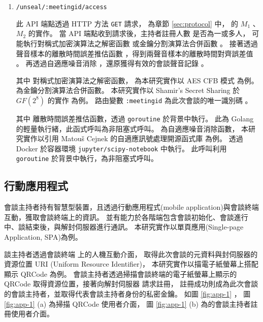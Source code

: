\begin{enumerate}
    \item \texttt{/unseal/:meetingid/access}

        此 API 端點透過 HTTP 方法 \texttt{GET} 請求，
    為章節 \ref{sec:protocol} 中，
     的 $M_{1}$ 、 $M_{2}$ 的實作。
    當 API 端點收到請求後，主持者註冊人數 \DEFowreg 是否為一或多人，
    可能執行對稱式加密演算法之解密函數 \DEFfuncDecEK{} 或金鑰分割演算法合併函數 \DEFfuncSSC{}。
    接著透過聲音樣本的離散時間誤差推估函數 \DEFfuncEstm{}，得到兩聲音樣本的離散時間對齊誤差值 \DEFshift。
    再透過自適應噪音消除 \DEFfuncAnc{}，還原獲得有效的會談聲音記錄 \DEFrecREV。

        其中 \DEFfuncDecEK{} 對稱式加密演算法之解密函數，
    為本研究實作以 AES CFB 模式 \cite{117146}\cite{9171} 為例。
    \DEFfuncSSC{} 為金鑰分割演算法合併函數。
    本研究實作以 Shamir's Secret Sharing \cite{shamir1979share} 於 $GF(2^8)$ 的實作 \cite{117146} 為例。
    路由變數 \texttt{:meetingid} 為此次會談的唯一識別碼 \DEFsessionID。

        其中 \DEFfuncEstm{} 離散時間誤差推估函數，透過 \texttt{goroutine} 於背景中執行。
    此為 Golang 的輕量執行緒，此函式呼叫為非阻塞式呼叫。
    \DEFfuncAnc{} 為自適應噪音消除函數，
    本研究實作以引用 Matouš Cejnek 的自適應訊號處理開源函式庫 \cite{cejnek2017padasip} 為例。
    透過 Docker 於容器環境 \texttt{jupyter/scipy-notebook} 中執行。
    此呼叫利用 \texttt{goroutine} 於背景中執行，為非阻塞式呼叫。
\end{enumerate}


\subsection{行動應用程式}

    會談主持者持有智慧型裝置，且透過行動應用程式(mobile application)與會談終端互動，獲取會談終端上的資訊。
並有能力於各階端包含會談初始化、會談進行中、談結束後，與解封伺服器進行通訊。
本研究實作以單頁應用(Single-page Application, SPA)為例。

    談主持者透過會談終端 \DEFmeetingbox 上的人機互動介面，
取得此次會談的元資料與封伺服器的資源位置 URI (Uniform Resource Identifier)，
本研究實作以描電子紙螢幕上搭配顯示 QRCode 為例。
會談主持者透過掃描會談終端的電子紙螢幕上顯示的 QRCode 取得資源位置，接著向解封伺服器 \DEFserver 請求註冊，
註冊成功則成為此次會談的會談主持者，並取得代表會談主持者身份的私密金鑰。
如圖 \ref{fig:app-1} ，
圖 \ref{fig:app-1} (a) 為掃描 QRCode 使用者介面，
圖 \ref{fig:app-1} (b) 為的會談主持者註冊使用者介面。

